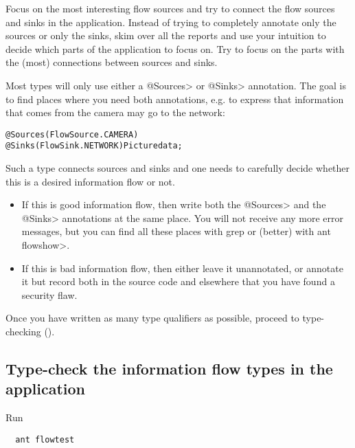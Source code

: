 Focus on the most interesting flow sources and try to connect the flow
sources and sinks in the application. Instead of trying to completely
annotate only the sources or only the sinks, skim over all the reports
and use your intuition to decide which parts of the application to
focus on. Try to focus on the parts with the (most) connections
between sources and sinks.

Most types will only use either a \<@Sources> or \<@Sinks>
annotation.
The goal is to find places where you need both annotations, e.g. to
express that information that comes from the camera may go to the
network:

\begin{alltt}
    @Sources(FlowSource.CAMERA)
    @Sinks(FlowSink.NETWORK) Picture data;
\end{alltt}

Such a type connects sources and sinks and one needs to carefully
decide whether this is a desired information flow or not.
\begin{itemize}
\item If this is good information flow, then write both the \<@Sources>
  and the \<@Sinks> annotations at the same place. You will not
  receive any more error messages, but you can find all these places
  with grep or (better) with \<ant flowshow>.
\item If this is bad information flow, then either leave it unannotated,
  or annotate it but record both in the source code and elsewhere that
  you have found a security flaw.
\end{itemize}


Once you have written as many type qualifiers as possible, proceed to
type-checking ().



\subsection{Type-check the information flow types in the application\label{sec:run-type-checker}}

Run

\begin{Verbatim}
  ant flowtest
\end{Verbatim}

